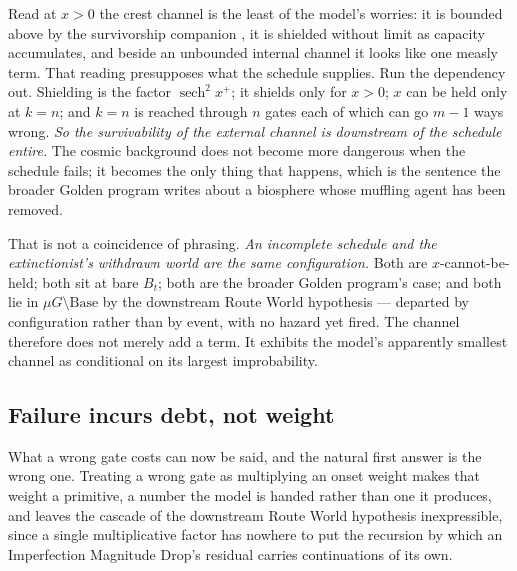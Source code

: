 \begin{remark}\label{sch:rem:reliance}
Read at $x>0$ the crest channel is the least of the model's worries: it
is bounded above by the survivorship companion \cite{GoldenSurvivorship}, it is shielded
without limit as capacity accumulates, and beside an unbounded internal
channel it looks like one measly term. That reading presupposes what the
schedule supplies. Run the dependency out. Shielding is the factor $\operatorname{sech}^2x^+$;
it shields only for $x>0$; $x$ can be held only at $k=n$; and
$k=n$ is reached through $n$ gates each of which can go $m-1$ ways
wrong. \emph{So the survivability of the external channel is downstream
of the schedule entire.} The cosmic background does not become more
dangerous when the schedule fails; it becomes the only thing that
happens, which is the sentence the broader Golden program writes
about a biosphere whose muffling agent has been removed.

That is not a coincidence of phrasing. \emph{An incomplete schedule and
the extinctionist's withdrawn world are the same configuration.} Both
are $x$-cannot-be-held; both sit at bare $B_t$; both are
the broader Golden program's case; and both lie in
$\mu G\setminus\mathrm{Base}$ by the downstream Route World hypothesis --- departed
by configuration rather than by event, with no hazard yet fired. The
channel therefore does not merely add a term. It exhibits the model's
apparently smallest channel as conditional on its largest improbability.
\end{remark}

\subsection{Failure incurs debt, not weight}\label{sch:subsub:debt}

What a wrong gate costs can now be said, and the natural first answer is
the wrong one. Treating a wrong gate as multiplying an onset weight
makes that weight a primitive, a number the model is handed rather
than one it produces, and leaves the cascade of
the downstream Route World hypothesis inexpressible, since a single multiplicative
factor has nowhere to put the recursion by which an Imperfection
Magnitude Drop's residual carries continuations of its own.

